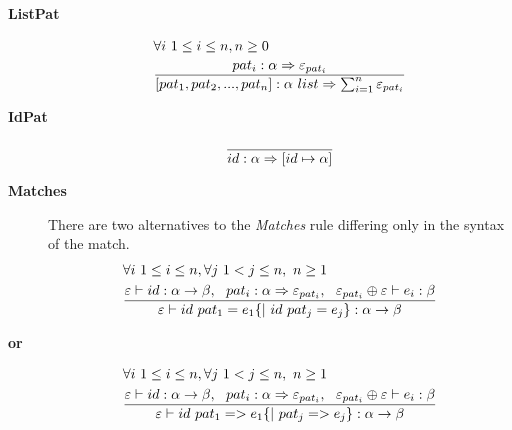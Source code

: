 \documentclass[10pt]{luthercs}
\begin{document}
{\begin{description}
\item[{\textbf{ListPat}}] \begin{gather}
\begin{split}&  \forall i~1 \leq i \leq n, n \geq 0\\
& \frac{pat_i : \alpha \Rightarrow \varepsilon_{pat_i}}
       {[pat_1,pat_2,...,pat_n]: \alpha~list\Rightarrow \sum^{n}_{i=1}\varepsilon_{pat_i}}\end{split}\notag
\end{gather}
\end{description}


\begin{description}
\item[{\textbf{IdPat}}] \begin{gather}
\begin{split}\frac{}{id:\alpha\Rightarrow[id\mapsto\alpha]}\end{split}\notag
\end{gather}
\end{description}


\begin{description}
\item[{\textbf{Matches}}] 
There are two alternatives to the \emph{Matches} rule differing only in the syntax of the match.
\begin{gather}
\begin{split}&  \forall i~1 \leq i \leq n, \forall j~1 < j \leq n,~n \geq 1\\
& \frac{\varepsilon\vdash id:\alpha\rightarrow\beta,~~pat_i:\alpha\Rightarrow
   \varepsilon_{pat_i},~~\varepsilon_{pat_i}\oplus\varepsilon\vdash e_i:\beta}
       {\varepsilon\vdash id~pat_1=e_1\{|~id~pat_j=e_j\}:\alpha\rightarrow\beta}\end{split}\notag
\end{gather}
\end{description}

\begin{description}
\item[{\textbf{or}}] \begin{gather}
\begin{split}&  \forall i~1 \leq i \leq n, \forall j~1 < j \leq n,~n \geq 1\\
& \frac{\varepsilon\vdash id:\alpha\rightarrow\beta,~~pat_i:\alpha\Rightarrow
   \varepsilon_{pat_i},~~\varepsilon_{pat_i}\oplus\varepsilon\vdash e_i:\beta}
       {\varepsilon\vdash id~pat_1=>e_1\{|~pat_j=>e_j\}:\alpha\rightarrow\beta}\end{split}\notag
\end{gather}
\end{description}


}
\end{document}

